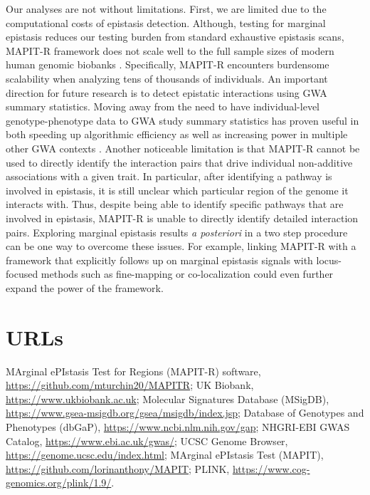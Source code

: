 \documentclass[10pt,a4paper]{article}
\begin{document}
Our analyses are not without limitations. First, we are limited due to the computational costs of epistasis detection. Although, testing for marginal epistasis reduces our testing burden from standard exhaustive epistasis scans, MAPIT-R framework does not scale well to the full sample sizes of modern human genomic biobanks \cite{Crawford2017a,Crawford:2018ab,Moore:2019aa}. Specifically, MAPIT-R encounters burdensome scalability when analyzing tens of thousands of individuals. An important direction for future research is to detect epistatic interactions using GWA summary statistics. Moving away from the need to have individual-level genotype-phenotype data to GWA study summary statistics has proven useful in both speeding up algorithmic efficiency as well as increasing power in multiple other GWA contexts \cite{Shi2016,Johnson2018,Ray2018,Turchin2019,Urbut2019,Cheng2020}. Another noticeable limitation is that MAPIT-R cannot be used to directly identify the interaction pairs that drive individual non-additive associations with a given trait. In particular, after identifying a pathway is involved in epistasis, it is still unclear which particular region of the genome it interacts with. Thus, despite being able to identify specific pathways that are involved in epistasis, MAPIT-R is unable to directly identify detailed interaction pairs. Exploring marginal epistasis results \textit{a posteriori} in a two step procedure can be one way to overcome these issues. For example, linking MAPIT-R with a framework that explicitly follows up on marginal epistasis signals with locus-focused methods such as fine-mapping \cite{Kichaev2014,Chen2015,Benner2016} or co-localization \cite{Hormozdiari2016,Zhu2016,Wen2017,Giambartolomei2018,Wallace2020} could even further expand the power of the framework. 

\section{URLs}\label{InterPath-URLs}

MArginal ePIstasis Test for Regions (MAPIT-R) software, \url{https://github.com/mturchin20/MAPITR}; UK Biobank, \url{https://www.ukbiobank.ac.uk}; Molecular Signatures Database (MSigDB), \url{https://www.gsea-msigdb.org/gsea/msigdb/index.jsp}; Database of Genotypes and Phenotypes (dbGaP), \url{https://www.ncbi.nlm.nih.gov/gap}; NHGRI-EBI GWAS Catalog, \url{https://www.ebi.ac.uk/gwas/}; UCSC Genome Browser, \url{https://genome.ucsc.edu/index.html}; MArginal ePIstasis Test (MAPIT), \url{https://github.com/lorinanthony/MAPIT}; PLINK, \url{https://www.cog-genomics.org/plink/1.9/}.
\end{document}
